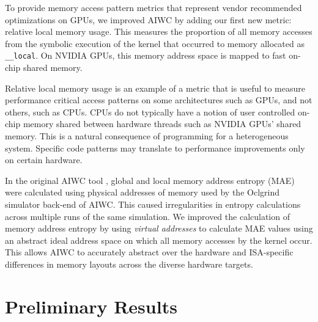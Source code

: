 \documentclass[review=false, sigchi]{acmart}
\begin{document}
	To provide memory access pattern metrics that represent vendor recommended optimizations on GPUs, we improved AIWC by adding our first new metric: relative local memory usage. This measures the proportion of all memory accesses from the symbolic execution of the kernel that occurred to memory allocated as \texttt{\_\_local}. On NVIDIA GPUs, this memory address space is mapped to fast on-chip shared memory.
	
	Relative local memory usage is an example of a metric that is useful to measure performance critical access patterns on some architectures such as GPUs, and not others, such as CPUs. CPUs do not typically have a notion of user controlled on-chip memory shared between hardware threads such as NVIDIA GPUs' shared memory. This is a natural consequence of programming for a heterogeneous system. Specific code patterns may translate to performance improvements only on certain hardware.
	
	In the original AIWC tool \cite{beau_johnston_2017_1134175}, global and local memory address entropy (MAE) were calculated using physical addresses of memory used by the Oclgrind simulator back-end of AIWC. This caused irregularities in entropy calculations across multiple runs of the same simulation. We improved the calculation of memory address entropy by using \textit{virtual addresses} to calculate MAE values using an abstract ideal address space on which all memory accesses by the kernel occur. This allows AIWC to accurately abstract over the hardware and ISA-specific differences in memory layouts across the diverse hardware targets.
		
	\section{Preliminary Results} \label{preliminary results}
	
\end{document}
